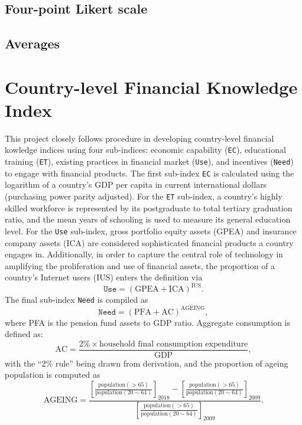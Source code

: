 \documentclass[a4paper,11pt,UKenglish,twoside,openright]{report}\usepackage[]{graphicx}\usepackage[]{color}
\begin{document}
\subsection{Four-point Likert scale}

\subsection{Averages}

\newpage

\section{Country-level Financial Knowledge Index}

This project closely follows  procedure in developing country-level financial kowledge indices using four sub-indices: economic capability (\texttt{EC}), educational training (\texttt{ET}), existing practices in financial market (\texttt{Use}), and incentives (\texttt{Need}) to engage with financial products. The first sub-index \texttt{EC} is calculated using the logarithm of a country's GDP per capita in current international dollars (purchasing power parity adjusted). For the \texttt{ET} sub-index, a country's highly skilled workforce is represented by its postgraduate to total tertiary graduation ratio, and the mean years of schooling is used to measure its general education level. For the \texttt{Use} sub-index, gross portfolio equity assets (GPEA) and insurance company assets (ICA) are considered sophisticated financial products a country engages in. Additionally, in order to capture the central role of technology in amplifying the proliferation and use of financial assets, the proportion of a country's Internet users (\textsc{IUS}) enters the definition via
\[ \texttt{Use} = ( \text{GPEA} + \text{ICA} ) ^ \text{IUS}. \]
The final sub-index \texttt{Need} is compiled as
\[ \texttt{Need} = ( \text{PFA} + \text{AC} ) ^ \text{AGEING}, \]
where \textsc{PFA} is the pension fund assets to GDP ratio. Aggregate consumption is defined as:
\[ \text{AC} = \frac{2\% \times \text{household final consumption expenditure}}{\text{GDP}}, \]
with the ``$2\%$ rule'' being drawn from  derivation, and the proportion of ageing population is computed as
\[ \text{AGEING} = \frac{ \left[ \frac{\text{population}(>65)}{\text{population}(20 \sim 64)} \right]_{2018} - \left[ \frac{\text{population}(>65)}{\text{population}(20 \sim 64)} \right]_{2009} }{ \left[ \frac{\text{population}(>65)}{\text{population}(20 \sim 64)} \right]_{2009} }. \]
\end{document}
